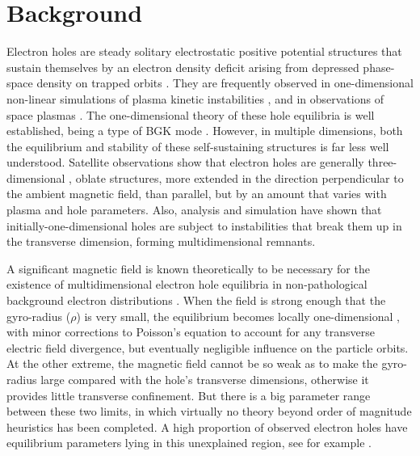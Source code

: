 \documentclass{agujournal2019}
\def\citep{\cite}
\begin{document}
\section{Background}

Electron holes are steady solitary electrostatic positive potential
structures that sustain themselves by an electron density deficit
arising from depressed phase-space density on trapped
orbits \citep{Turikov1984,Schamel1986a,Eliasson2006,Hutchinson2017}. They are
frequently observed in one-dimensional non-linear simulations of
plasma kinetic instabilities \citep{Morse1969,Berk1970,Omura1996,Miyake1998a,Hutchinson2017}, and in observations of space
plasmas \citep{Matsumoto1994,Ergun1998,Bale1998,Mangeney1999,Pickett2008,Andersson2009,Wilson2010,Malaspina2013,Malaspina2014,Vasko2015,Mozer2016,Hutchinson2018b,Mozer2018}. The one-dimensional theory of these hole equilibria is well
established, being a type of BGK mode \citep{Bernstein1957}. However, in multiple
dimensions, both the equilibrium and stability of these self-sustaining
structures is far less well understood. Satellite observations
show that electron holes are generally
three-dimensional \citep{Franz2000,Vasko2017,Holmes2018,Tong2018}, oblate
structures, more extended in the direction perpendicular to the
ambient magnetic field, than parallel, but by an amount that varies
with plasma and hole parameters. Also, analysis and simulation have
shown that initially-one-dimensional holes are subject to
instabilities \citep{Mottez1997,Miyake1998a,Goldman1999,Oppenheim1999,Muschietti2000,Oppenheim2001b,Singh2001,Lu2008,Hutchinson2018,Hutchinson2018a,Hutchinson2019,Hutchinson2019a}
that break them up in the transverse dimension, forming multidimensional remnants.

A significant magnetic field is known theoretically to be necessary
for the existence of multidimensional electron hole equilibria in
non-pathological background electron
distributions \citep{Krasovsky2004,Ng2005,Ng2006}. When the field is
strong enough that the gyro-radius ($\rho$) is very small, the
equilibrium becomes locally one-dimensional \citep{Chen2002,Jovanovic2002a}, with minor corrections to
Poisson's equation to account for any transverse electric field
divergence, but eventually negligible influence on the particle
orbits. At the other extreme, the magnetic field cannot be so weak as
to make the gyro-radius large compared with the hole's transverse
dimensions, otherwise it provides little transverse
confinement. But there is a big parameter range between these two
limits, in which virtually no theory beyond order of magnitude
heuristics has been completed. A high proportion of observed electron
holes have equilibrium parameters lying in this unexplained region,
see for example \cite{Franz2000,Vasko2017,Holmes2018}.
\end{document}
